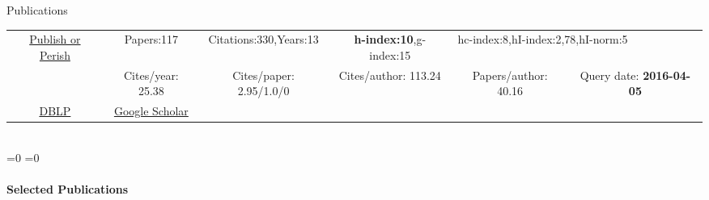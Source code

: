 \begin{rubrique}{Publications}

  {\footnotesize


    \begin{tabular}{|c||ccccc|}
      \hline
      \multirow{2}{4em}{\href{http://www.harzing.com/pop.htm}{Publish or Perish}}
      & Papers:117        & Citations:330,Years:13   & \textbf{h-index:10},g-index:15 & \multicolumn{2}{l|}{hc-index:8,hI-index:2,78,hI-norm:5}\\
      & Cites/year: 25.38 & Cites/paper: 2.95/1.0/0  & Cites/author: 113.24 & Papers/author: 40.16 & Query date: \textbf{2016-04-05}\\
      \hline
      \href{http://www.informatik.uni-trier.de/~ley/pers/hd/v/Varrette:S=eacute=bastien.html}{DBLP} &
                                                                                                      \multicolumn{1}{c|}{\href{https://scholar.google.fr/citations?hl=fr\&user=6PTStIcAAAAJ\&view_op=list_works\&sortby=pubdate}{Google Scholar}}\\
      \cline{1-2}
    \end{tabular}
  }
  ~\\[2em]

  \ifnum\pdfstrcmp{\cvtype}{\cvtiny}=0%
  \else
  \ifnum\pdfstrcmp{\cvtype}{\cvfull}=0%



  \else
  \vspace{-1em}
  \paragraph{Selected Publications}~\\

  \fi
  \fi

\end{rubrique}





%
